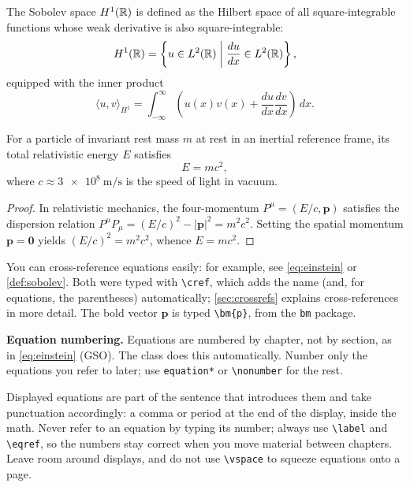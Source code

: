 \begin{definition}
\label{def:sobolev}
The Sobolev space $H^1(\mathbb{R})$ is defined as the Hilbert space of all square-integrable functions whose weak derivative is also square-integrable:
\begin{equation}
\label{eq:sobolev}
H^1(\mathbb{R}) = \left\{ u \in L^2(\mathbb{R}) \;\middle|\; \frac{du}{dx} \in L^2(\mathbb{R}) \right\},
\end{equation}
equipped with the inner product
\begin{equation}
\label{eq:innerprod}
\langle u, v \rangle_{H^1} = \int_{-\infty}^{\infty} \left( u(x)v(x) + \frac{du}{dx}\frac{dv}{dx} \right) \, dx.
\end{equation}
\end{definition}

\begin{theorem}
\label{thm:einstein}
For a particle of invariant rest mass $m$ at rest in an inertial reference frame, its total relativistic energy $E$ satisfies
\begin{equation}
\label{eq:einstein}
E = m c^2,
\end{equation}
where $c \approx \qty{3e8}{\metre\per\second}$ is the speed of light in vacuum.
\end{theorem}

\begin{proof}
In relativistic mechanics, the four-momentum $P^\mu = (E/c, \bm{p})$ satisfies the dispersion relation $P^\mu P_\mu = (E/c)^2 - |\bm{p}|^2 = m^2 c^2$. Setting the spatial momentum $\bm{p} = \bm{0}$ yields $(E/c)^2 = m^2 c^2$, whence $E = mc^2$.
\end{proof}

You can cross-reference equations easily: for example, see \cref{eq:einstein} or \cref{def:sobolev}. Both were typed with \verb+\cref+, which adds the name (and, for equations, the parentheses) automatically; \cref{sec:crossrefs} explains cross-references in more detail. The bold vector $\bm{p}$ is typed \verb+\bm{p}+, from the \texttt{bm} package.

\textbf{Equation numbering.} Equations are numbered by chapter, not by section, as in \cref{eq:einstein} (GSO). The class does this automatically. Number only the equations you refer to later; use \verb+equation*+ or \verb+\nonumber+ for the rest.

Displayed equations are part of the sentence that introduces them and take punctuation accordingly: a comma or period at the end of the display, inside the math. Never refer to an equation by typing its number; always use \verb+\label+ and \verb+\eqref+, so the numbers stay correct when you move material between chapters. Leave room around displays, and do not use \verb+\vspace+ to squeeze equations onto a page.

